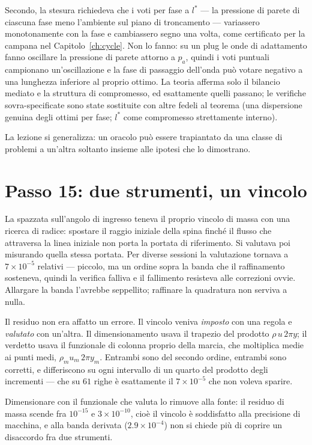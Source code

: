 Secondo, la stesura richiedeva che i voti per fase a $l^{*}$ --- la
pressione di parete di ciascuna fase meno l'ambiente sul piano di
troncamento --- variassero monotonamente con la fase e cambiassero
segno una volta, come certificato per la campana nel
Capitolo~\ref{ch:cycle}. Non lo fanno: su un plug le onde di
adattamento fanno oscillare la pressione di parete attorno a $p_a$,
quindi i voti puntuali campionano un'oscillazione e la fase di
passaggio dell'onda può votare negativo a una lunghezza inferiore al
proprio ottimo. La teoria afferma solo il bilancio mediato e la
struttura di compromesso, ed esattamente quelli passano; le verifiche
sovra-specificate sono state sostituite con altre fedeli al teorema
(una dispersione genuina degli ottimi per fase; $l^{*}$ come
compromesso strettamente interno).

La lezione si generalizza: un oracolo può essere trapiantato da una
classe di problemi a un'altra soltanto insieme alle ipotesi che lo
dimostrano.

\section{Passo 15: due strumenti, un vincolo}
\label{app:twoinstruments}

La spazzata sull'angolo di ingresso teneva il proprio vincolo di massa
con una ricerca di radice: spostare il raggio iniziale della spina
finché il flusso che attraversa la linea iniziale non porta la portata
di riferimento. Si valutava poi misurando quella stessa portata. Per
diverse sessioni la valutazione tornava a $7\times10^{-5}$ relativi
--- piccolo, ma un ordine sopra la banda che il raffinamento
sosteneva, quindi la verifica falliva e il fallimento resisteva alle
correzioni ovvie. Allargare la banda l'avrebbe seppellito; raffinare
la quadratura non serviva a nulla.

Il residuo non era affatto un errore. Il vincolo veniva
\emph{imposto} con una regola e \emph{valutato} con un'altra. Il
dimensionamento usava il trapezio del prodotto $\rho\, u\, 2\pi y$; il
verdetto usava il funzionale di colonna proprio della marcia, che
moltiplica medie ai punti medi, $\rho_m u_m\, 2\pi y_m$. Entrambi sono
del secondo ordine, entrambi sono corretti, e differiscono su ogni
intervallo di un quarto del prodotto degli incrementi --- che su $61$
righe è esattamente il $7\times10^{-5}$ che non voleva sparire.

Dimensionare con il funzionale che valuta lo rimuove alla fonte: il
residuo di massa scende fra $10^{-15}$ e $3\times10^{-10}$, cioè il
vincolo è soddisfatto alla precisione di macchina, e alla banda
derivata ($2.9\times10^{-4}$) non si chiede più di coprire un
disaccordo fra due strumenti.

